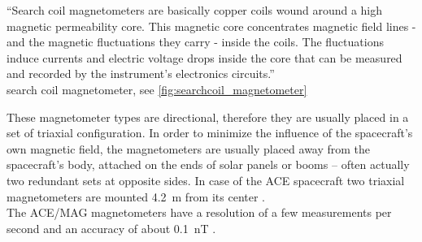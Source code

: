 
``Search coil magnetometers are basically copper coils wound around a high magnetic permeability core. This magnetic core concentrates magnetic field lines - and the magnetic fluctuations they carry - inside the coils. The fluctuations induce currents and electric voltage drops inside the core that can be measured and recorded by the instrument's electronics circuits.''\\

search coil magnetometer, see \autoref{fig:searchcoil_magnetometer}\\
\begin{figure}[htb]
\end{figure}

These magnetometer types are directional, therefore they are usually placed in a set of triaxial configuration. In order to minimize the influence of the spacecraft's own magnetic field, the magnetometers are usually placed away from the spacecraft's body, attached on the ends of solar panels or booms -- often actually two redundant sets at opposite sides. In case of the ACE spacecraft two triaxial magnetometers are mounted \SI{4.2}{\meter} from its center \citep{Smith1998}.\\

The ACE/MAG magnetometers have a resolution of a few measurements per second and an accuracy of about \SI{0.1}{\nano\tesla} \citep{Smith1998}.\\

